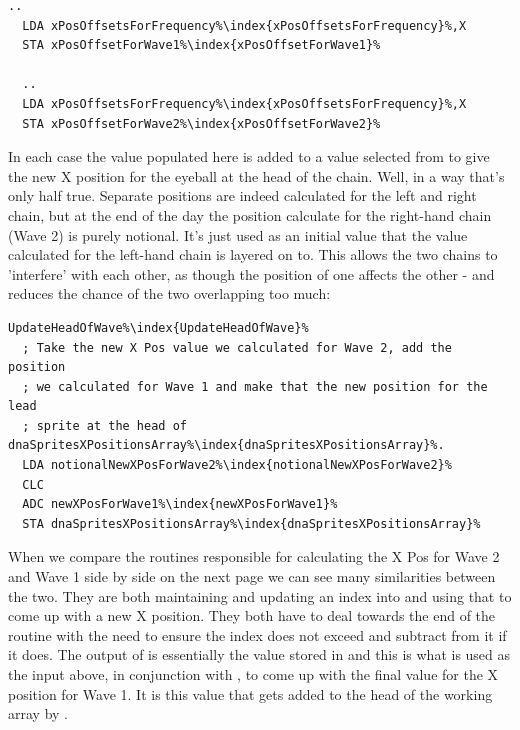\begin{lstlisting}[escapechar=\%]
  ..
  LDA xPosOffsetsForFrequency%\index{xPosOffsetsForFrequency}%,X
  STA xPosOffsetForWave1%\index{xPosOffsetForWave1}%

  ..
  LDA xPosOffsetsForFrequency%\index{xPosOffsetsForFrequency}%,X
  STA xPosOffsetForWave2%\index{xPosOffsetForWave2}%
\end{lstlisting}

In each case the value populated here is added to a value selected from  to give the 
new X position for the eyeball at the head of the chain. Well, in a way that's only half true. Separate positions
are indeed calculated for the left and right chain, but at the end of the day the position calculate for the right-hand
chain (Wave 2) is purely notional. It's just used as an initial value that the value calculated for the left-hand chain
is layered on to. This allows the two chains to 'interfere' with each other, as though the position of one affects the
other - and reduces the chance of the two overlapping too much:

\begin{lstlisting}[caption=From \icode{CalculateValueOfNewXPosForWave1},escapechar=\%]
UpdateHeadOfWave%\index{UpdateHeadOfWave}%   
  ; Take the new X Pos value we calculated for Wave 2, add the position
  ; we calculated for Wave 1 and make that the new position for the lead
  ; sprite at the head of dnaSpritesXPositionsArray%\index{dnaSpritesXPositionsArray}%.
  LDA notionalNewXPosForWave2%\index{notionalNewXPosForWave2}%
  CLC
  ADC newXPosForWave1%\index{newXPosForWave1}%
  STA dnaSpritesXPositionsArray%\index{dnaSpritesXPositionsArray}%
\end{lstlisting}

When we compare the routines responsible for calculating the X Pos for Wave 2 and Wave 1 side by side on the next
page we can see many similarities between the two. They are both maintaining and updating an index into 
 and using that to come up with a new X position. They both have to deal towards the end
of the routine with the need to ensure the index does not exceed  and subtract  from it if
it does. The output of  is essentially the value stored in 
and this is what is used as the input above, in conjunction with , to come up with the final
value for the X position for Wave 1. It is this value that gets added to the head of the working array 
by .

